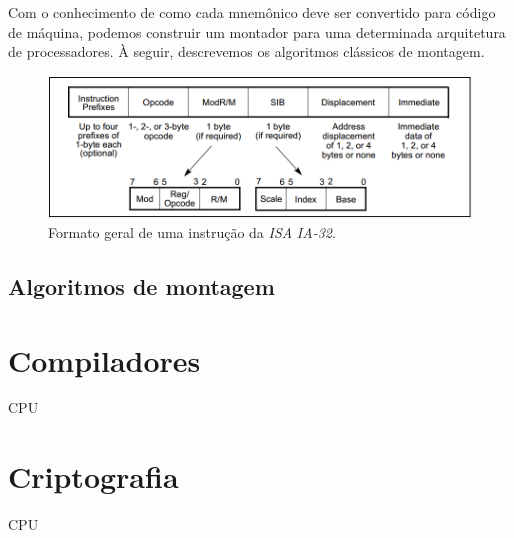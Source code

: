 Com o conhecimento de como cada mnemônico deve ser convertido para código de máquina, podemos construir um montador para uma determinada arquitetura de processadores. À seguir, descrevemos os algoritmos clássicos de montagem.

\begin{figure}[ptb]
  \begin{center}
    \includegraphics[scale=.6]{imagens/instrucoes_ia32}
  \end{center}
  \caption{Formato geral de uma instrução da \textit{ISA} \textit{IA-32}.}
  \label{instrucoes_ia32}
\end{figure}

\subsection{Algoritmos de montagem}



\section{Compiladores}

CPU

\section{Criptografia}

CPU
